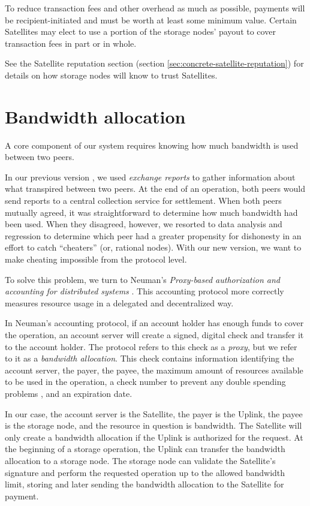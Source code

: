 \documentclass[8pt,fleqn,openany]{book}
\begin{document}
To reduce transaction fees and other overhead as much as possible, payments
will be recipient-initiated and must be worth at least some minimum value.
Certain Satellites may elect to use a portion of the storage nodes' payout to
cover transaction fees in part or in whole.

See the Satellite reputation section
(section \ref{sec:concrete-satellite-reputation}) for details on
how storage nodes will know to trust Satellites.

\section{Bandwidth allocation}\label{baer}

A core component of our system requires knowing how much bandwidth is used
between two peers.

In our previous version \cite{storj-v2, sip9}, we used
{\em exchange reports} to gather information about what transpired between
two peers. At the end of an operation, both peers would send reports to a
central collection service for settlement. When both peers mutually agreed,
it was straightforward to determine how much bandwidth had been used.
When they disagreed, however, we resorted to data analysis and regression to
determine which peer had a greater propensity for dishonesty in an effort to
catch ``cheaters'' (or, rational nodes).
With our new version, we want to make cheating impossible from the protocol
level.

To solve this problem, we turn to Neuman's {\em Proxy-based authorization
and accounting for distributed systems} \cite{proxy-accounting}. This accounting
protocol more correctly measures resource usage in a delegated and decentralized
way.

In Neuman's accounting protocol, if an account holder has enough funds to
cover the operation, an account server will create a signed,
digital check and transfer it to the account holder.
The protocol refers to this check as a {\em proxy}, but we refer
to it as a {\em bandwidth allocation}. This check contains information
identifying the account server, the payer, the payee, the maximum amount of
resources available to be used in the operation, a check number to prevent
any double spending problems \cite{schneier}, and an expiration date.

In our case, the account server is the
Satellite, the payer is the Uplink, the payee is the storage node, and the
resource in question is bandwidth. The Satellite will only create a bandwidth
allocation if the Uplink is authorized for the request.
At the beginning of a storage operation, the Uplink can transfer the bandwidth
allocation to a storage node. The storage node can validate the Satellite's
signature and perform the requested operation up to the allowed bandwidth
limit, storing and later sending the bandwidth allocation to the Satellite for
payment.
\end{document}
